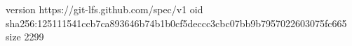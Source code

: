 version https://git-lfs.github.com/spec/v1
oid sha256:125111541ccb7ca893646b74b1b0cf5deccc3cbc07bb9b7957022603075fc665
size 2299

